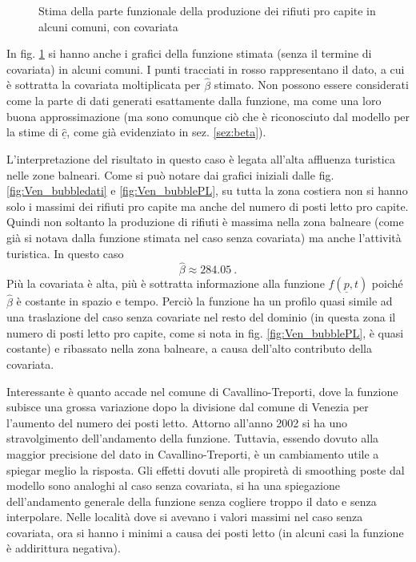 \documentclass[a4paper,11pt,twoside,openright]{book}							%
\begin{document}
\begin{figure}[t]
{   }
	\caption{Stima della parte funzionale della produzione dei rifiuti pro capite in alcuni comuni, con covariata}
	\label{fig:Vencovar_tempo}
\end{figure}
\newpage
In fig. \ref{fig:Vencovar_tempo} si hanno anche i grafici della funzione stimata (senza il termine di covariata) in alcuni comuni. I punti tracciati in rosso rappresentano il dato, a cui è sottratta la covariata moltiplicata per $\hat{\beta}$ stimato. Non possono essere considerati come la parte di dati generati esattamente dalla funzione, ma come una loro buona approssimazione (ma sono comunque ciò che è riconosciuto dal modello per la stime di $\hat{\underline{c}}$, come già evidenziato in sez. \ref{sez:beta}).

L'interpretazione del risultato in questo caso è legata all'alta affluenza turistica nelle zone balneari. Come si può notare dai grafici iniziali dalle fig. \ref{fig:Ven_bubbledati} e \ref{fig:Ven_bubblePL}, su tutta la zona costiera non si hanno solo i massimi dei rifiuti pro capite ma anche del numero di posti letto pro capite. Quindi non soltanto la produzione di rifiuti è massima nella zona balneare (come già si notava dalla funzione stimata nel caso senza covariata) ma anche l'attività turistica. In questo caso
$$
\hat{\beta}\approx284.05 \ .
$$
Più la covariata è alta, più è sottratta informazione alla funzione $f(\underline p,t)$ poiché $\hat{\beta}$ è costante in spazio e tempo. Perciò la funzione ha un profilo quasi simile ad una traslazione del caso senza covariate nel resto del dominio (in questa zona il numero di posti letto pro capite, come si nota in fig. \ref{fig:Ven_bubblePL}, è quasi costante) e ribassato nella zona balneare, a causa dell'alto contributo della covariata.

Interessante è quanto accade nel comune di Cavallino-Treporti, dove la funzione subisce una grossa variazione dopo la divisione dal comune di Venezia per l'aumento del numero dei posti letto. Attorno all'anno 2002 si ha uno stravolgimento dell'andamento della funzione. Tuttavia, essendo dovuto alla maggior precisione del dato in Cavallino-Treporti, è un cambiamento utile a spiegar meglio la risposta. Gli effetti dovuti alle propiretà di smoothing poste dal modello sono analoghi al caso senza covariata, si ha una spiegazione dell'andamento generale della funzione senza cogliere troppo il dato e senza interpolare. Nelle località dove si avevano i valori massimi nel caso senza covariata, ora si hanno i minimi a causa dei posti letto (in alcuni casi la funzione è addirittura negativa).
\end{document}
